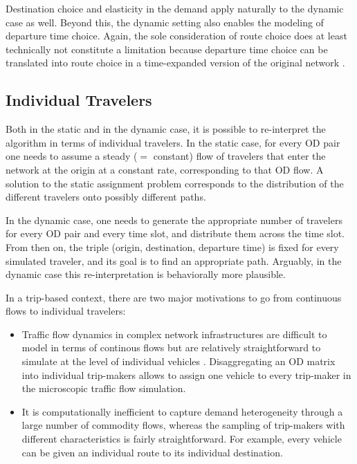 Destination choice and elasticity in the demand apply naturally to 
the dynamic case as well. Beyond this, the dynamic setting also enables 
the modeling of departure time choice. Again, the sole consideration 
of route choice does at least technically not constitute a limitation 
because departure time choice can be translated into route choice in a 
time-expanded version of the original network \citep{vanderzijpp-2001}.


\subsection{Individual Travelers}
\label{sec:indiv-trav}

Both in the static and in the dynamic case, it is possible to
re-interpret the algorithm in terms of individual travelers.  
%
In the static case, for every OD pair one needs to
assume a steady ($=$ constant) flow of travelers that enter the
network at the origin at a constant rate, corresponding to that OD flow.
A solution to the static assignment problem corresponds to the
distribution of the different travelers onto possibly different paths.

In the dynamic case, one needs to generate the appropriate number of
travelers for every OD pair and every time slot, and distribute them
across the time slot.  From then on, the triple (origin, destination,
departure time) is fixed for every simulated traveler, and its goal is
to find an appropriate path.  
%
%
Arguably, in the dynamic case this re-interpretation is behaviorally
more plausible.

In a trip-based context, there are two major motivations to go from 
continuous flows to individual travelers:
\begin{itemize}

\item Traffic flow dynamics in complex network infrastructures are 
difficult to model in terms of continous flows 
\citep[e.g.,][]{floetteroed-2011a} but are relatively straightforward 
to simulate at the level of individual vehicles
\citep[][]{aimsun-www,paramics-www,transmodeler-www,vissim-www}. 
Disaggregating an OD matrix into individual trip-makers allows to 
assign one vehicle to every trip-maker in the microscopic traffic flow 
simulation.

\item It is computationally inefficient to capture demand heterogeneity 
through a large number of commodity flows, whereas the sampling of 
trip-makers with different characteristics is fairly straightforward. 
For example, every vehicle can be given an individual route to its individual 
destination.

\end{itemize}

